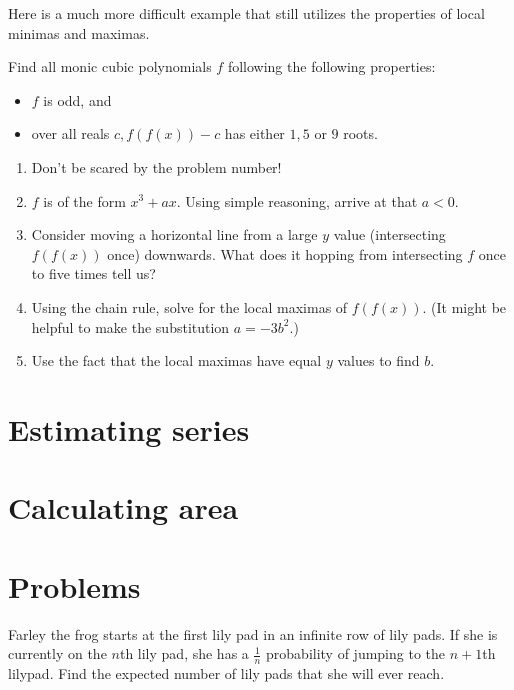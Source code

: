 \documentclass{article}
\begin{document}
Here is a much more difficult example that still utilizes the properties of local minimas and maximas.
\begin{exam}
Find all monic cubic polynomials $f$ following the following properties:
\begin{itemize}
\item $f$ is odd, and
\item over all reals $c, f(f(x))-c$ has either $1, 5$ or $9$ roots.
\end{itemize}
\end{exam}
\begin{walk}
\begin{enumerate}
\item Don't be scared by the problem number!
\item $f$ is of the form $x^3+ax$. Using simple reasoning, arrive at that $a<0$.
\item Consider moving a horizontal line from a large $y$ value (intersecting $f(f(x))$ once) downwards. What does it hopping from intersecting $f$ once to five times tell us?
\item Using the chain rule, solve for the local maximas of $f(f(x))$. (It might be helpful to make the substitution $a=-3b^2$.)
\item Use the fact that the local maximas have equal $y$ values to find $b$.
\end{enumerate}
\end{walk}
\section{Estimating series}

\section{Calculating area}

\section{Problems}
\noindent{}

\begin{prob}[SMT 2021]{2}
Farley the frog starts at the first lily pad in an infinite row of lily pads. If she is currently on the $n$th lily pad, she has a $\frac{1}{n}$ probability of jumping to the $n+1$th lilypad. Find the expected number of lily pads that she will ever reach.
\end{prob}
\end{document}
